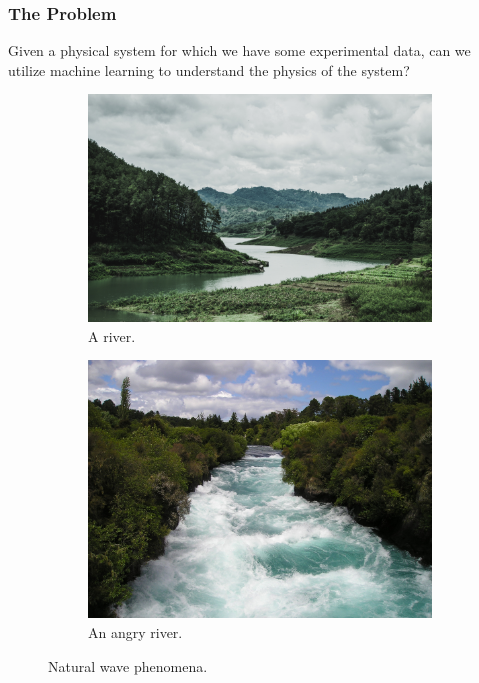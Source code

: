 \begin{frame}
    \frametitle{The Problem}

    Given a physical system for which we have some experimental data, can we utilize machine learning to understand the
    physics of the system?
    \bigskip

    \begin{figure}
        \centering
        \begin{subfigure}[b]{0.45\textwidth}
            \centering
            \includegraphics[width=\textwidth]{images/pexels-rido-alwarno-1034887.jpg}
            \caption{A river.}
            \label{fig:01_river}
        \end{subfigure}
        \hfill
        \begin{subfigure}[b]{0.45\textwidth}
            \centering
            \includegraphics[width=\textwidth]{images/pexels-pixabay-2438.jpg}
            \caption{An angry river.}
            \label{fig:01_angry_river}
        \end{subfigure}
        \caption{Natural wave phenomena.}
        \label{fig:rivers}
    \end{figure}
\end{frame}